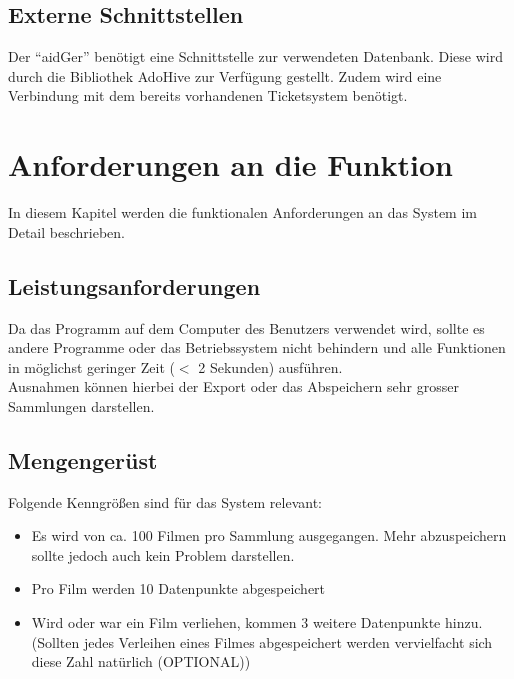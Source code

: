 \documentclass[oneside,german,oneside]{scrbook}
\begin{document}
    \subsection{Externe Schnittstellen}\label{sec:Schnittstellen}

        Der ``aidGer'' benötigt eine Schnittstelle zur verwendeten 
        Datenbank. Diese wird durch die Bibliothek AdoHive zur Verfügung
        gestellt. Zudem wird eine Verbindung mit dem bereits vorhandenen
        Ticketsystem benötigt.

    \pagebreak

\section{Anforderungen an die Funktion}

    In diesem Kapitel werden die funktionalen Anforderungen an das System im
    Detail beschrieben.

    \subsection{Leistungsanforderungen}\label{sec:Leistungsanforderungen}

        Da das Programm auf dem Computer des Benutzers verwendet wird, sollte es
        andere Programme oder das Betriebssystem nicht behindern und alle
        Funktionen in m\"oglichst geringer Zeit ($<$ 2 Sekunden) ausf\"uhren.\\
        Ausnahmen k\"onnen hierbei der Export oder das Abspeichern sehr grosser
        Sammlungen darstellen.

    \subsection{Mengenger\"ust}\label{sec:Mengengeruest}

        Folgende Kenngr\"o{\ss}en sind f\"ur das System relevant:

        \begin{itemize}
          \item Es wird von ca. 100 Filmen pro Sammlung ausgegangen. Mehr
          abzuspeichern sollte jedoch auch kein Problem darstellen.
          \item Pro Film werden 10 Datenpunkte abgespeichert
          \item Wird oder war ein Film verliehen, kommen 3 weitere Datenpunkte
          hinzu. (Sollten jedes Verleihen eines Filmes abgespeichert werden
          vervielfacht sich diese Zahl nat\"urlich (OPTIONAL))
        \end{itemize}
\end{document}
